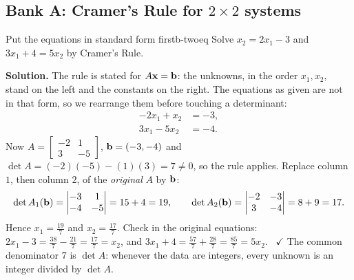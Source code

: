 \documentclass[11pt]{article}
\begin{document}
\subsection*{Bank A: Cramer's Rule for $2\times2$ systems}

\begin{exmp}{Put the equations in standard form first}{b-twoeq}
Solve $x_2=2x_1-3$ and $3x_1+4=5x_2$ by Cramer's Rule.

\textbf{Solution.} The rule is stated for $A\mathbf{x}=\mathbf{b}$: the unknowns, in the order $x_1,x_2$, stand on the left and the constants on the right. The equations as given are not in that form, so we rearrange them before touching a determinant:
\begin{align*}
-2x_1+x_2&=-3,\\
3x_1-5x_2&=-4.
\end{align*}
Now $A=\begin{bmatrix}-2&1\\3&-5\end{bmatrix}$, $\mathbf{b}=(-3,-4)$ and $\det A=(-2)(-5)-(1)(3)=7\neq0$, so the rule applies. Replace column $1$, then column $2$, of the \emph{original} $A$ by $\mathbf{b}$:
\[
\det A_1(\mathbf{b})=\begin{vmatrix}-3&1\\-4&-5\end{vmatrix}=15+4=19,\qquad
\det A_2(\mathbf{b})=\begin{vmatrix}-2&-3\\3&-4\end{vmatrix}=8+9=17.
\]
Hence $x_1=\frac{19}7$ and $x_2=\frac{17}7$. Check in the original equations: $2x_1-3=\frac{38}7-\frac{21}7=\frac{17}7=x_2$, and $3x_1+4=\frac{57}7+\frac{28}7=\frac{85}7=5x_2$. \ $\checkmark$ The common denominator $7$ is $\det A$: whenever the data are integers, every unknown is an integer divided by $\det A$.
\end{exmp}
\end{document}
